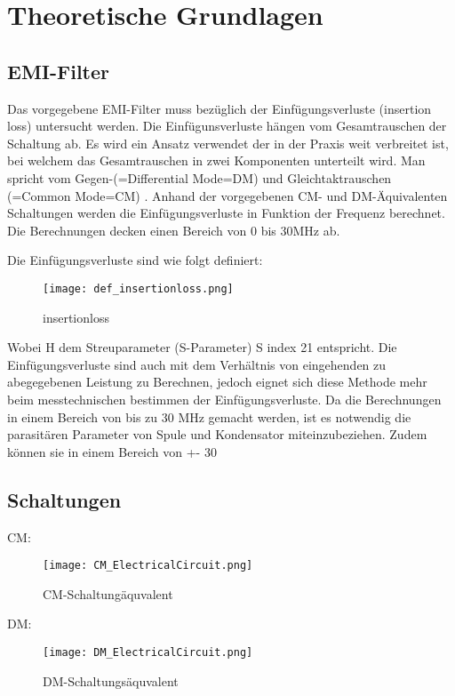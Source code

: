 \section{Theoretische Grundlagen} \label{sec:TheoretischeGrundlagen}

\subsection{EMI-Filter} \label{subsec:emifilter}
Das vorgegebene EMI-Filter muss bezüglich der Einfügungsverluste (insertion loss) untersucht werden. Die Einfügunsverluste hängen vom Gesamtrauschen der Schaltung ab. Es wird ein Ansatz verwendet der in der Praxis weit verbreitet ist, bei welchem das Gesamtrauschen in zwei Komponenten unterteilt wird. Man spricht vom Gegen-(=Differential Mode=DM) und Gleichtaktrauschen (=Common Mode=CM) . Anhand der vorgegebenen CM- und DM-Äquivalenten Schaltungen werden die Einfügungsverluste in Funktion der Frequenz berechnet. Die Berechnungen decken einen Bereich von 0 bis 30MHz ab.

Die Einfügungsverluste sind wie folgt definiert: 

\begin{figure}[H]
	\centering
	\texttt{[image: def\_insertionloss.png]}
	\caption{insertionloss}
	\label{fig:insertion loss}
\end{figure}
Wobei H dem Streuparameter (S-Parameter) S index 21 entspricht. Die Einfügungsverluste sind auch mit dem Verhältnis von eingehenden zu abegegebenen Leistung zu Berechnen, jedoch eignet sich diese Methode mehr beim messtechnischen bestimmen der Einfügungsverluste. Da die Berechnungen in einem Bereich von bis zu 30 MHz gemacht werden, ist es notwendig die parasitären Parameter von Spule und Kondensator miteinzubeziehen. Zudem können sie in einem Bereich von +- 30%

\subsection{Schaltungen} \label{subsec:schaltungen}
CM:
\begin{figure}[H]
	\centering
	\texttt{[image: CM\_ElectricalCircuit.png]}
	\caption{CM-Schaltungäquvalent}
	\label{fig:CM-Schaltungäquvalent}
\end{figure}
DM:
\begin{figure}[H]
	\centering
	\texttt{[image: DM\_ElectricalCircuit.png]}
	\caption{DM-Schaltungsäquvalent}
	\label{fig:DM-Schaltungsäquvalent}
\end{figure}
